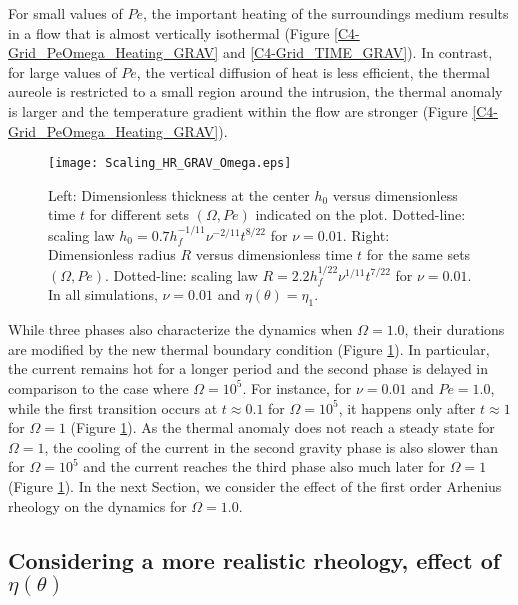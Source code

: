 For small  values of $Pe$,  the important heating of  the surroundings
medium results in a flow that is almost vertically isothermal (Figure
\ref{C4-Grid_PeOmega_Heating_GRAV}  and \ref{C4-Grid_TIME_GRAV}).   In
contrast, for large values of $Pe$,  the vertical diffusion of heat is
less efficient,  the thermal aureole  is restricted to a  small region
around  the  intrusion,   the  thermal  anomaly  is   larger  and  the
temperature   gradient   within   the  flow   are   stronger   (Figure
\ref{C4-Grid_PeOmega_Heating_GRAV}).
\begin{figure}[h!]
  \begin{center}
    \graphicspath{ {/Users/thorey/Documents/These/Projet/Refroidissement/Skin_Model/Figure/Figure_Heating/} }
    \texttt{[image: Scaling\_HR\_GRAV\_Omega.eps]}
    \caption{Left: Dimensionless thickness at  the center $h_0$ versus
      dimensionless   time  $t$   for  different   sets  $(\Omega,Pe)$
      indicated    on   the    plot.     Dotted-line:   scaling    law
      $h_0=  0.7h_f^{-1/11}\nu^{-2/11}t^{8/22}$  for   $\nu  =  0.01$.
      Right: Dimensionless  radius $R$  versus dimensionless  time $t$
      for  the  same  sets $(\Omega,Pe)$.   Dotted-line:  scaling  law
      $R= 2.2h_f^{1/22}\nu^{1/11}t^{7/22}$  for $\nu = 0.01$.   In all
      simulations, $\nu=0.01$ and $\eta(\theta)=\eta_1$.}
    \label{C4-Scaling_HR_GRAV_Omega}
  \end{center}
\end{figure}

While three  phases also characterize the  dynamics when $\Omega=1.0$,
their durations  are modified  by the  new thermal  boundary condition
(Figure \ref{C4-Scaling_HR_GRAV_Omega}).   In particular,  the current
remains  hot for  a longer  period  and the  second phase  is
delayed in comparison to the case where $\Omega =10^5$.  For instance,
for  $\nu=0.01$ and  $Pe=1.0$, while  the first  transition occurs  at
$t \approx 0.1$ for $\Omega=10^5$,  it happens only after $t\approx 1$
for  $\Omega=1$   (Figure  \ref{C4-Scaling_HR_GRAV_Omega}).    As  the
thermal  anomaly does  not reach  a steady  state for  $\Omega=1$, the
cooling of the current in the second gravity phase is also slower than
for $\Omega=10^5$  and the current  reaches the third phase  also much
later for $\Omega=1$  (Figure \ref{C4-Scaling_HR_GRAV_Omega}).  In the
next  Section, we  consider the  effect  of the  first order  Arhenius
rheology on the dynamics for $\Omega=1.0$.

\subsection{Considering   a  more   realistic   rheology,  effect   of
  $\eta(\theta)$}
\label{C4-sec:cons-more-real-1}
 
